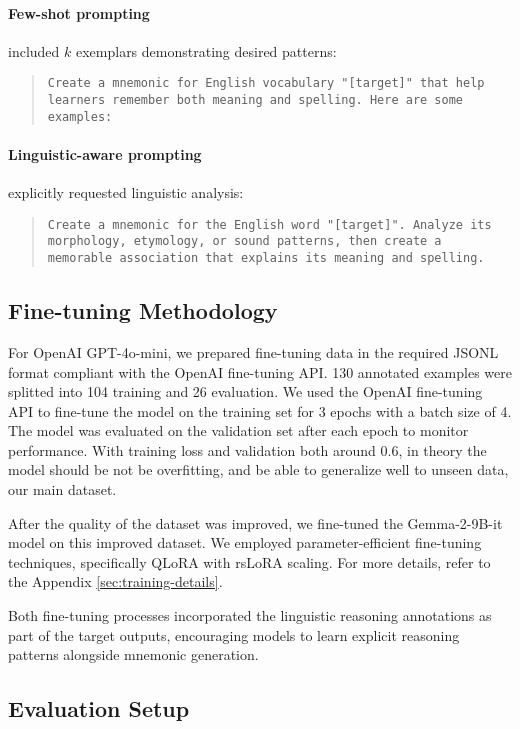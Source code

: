 \documentclass{article}
\newcounter{para}
\begin{document}
\paragraph{Few-shot prompting} included $k$ exemplars demonstrating desired patterns:

\begin{quote}
\texttt{Create a mnemonic for English vocabulary "[target]" that help learners remember both meaning and spelling. Here are some examples:}
\end{quote}

\paragraph{Linguistic-aware prompting} explicitly requested linguistic analysis:
\begin{quote}
\texttt{Create a mnemonic for the English word "[target]". Analyze its morphology, etymology, or sound patterns, then create a memorable association that explains its meaning and spelling.}

\end{quote}

\subsection{Fine-tuning Methodology} \label{sec:ft-methodology}
For OpenAI GPT-4o-mini, we prepared fine-tuning data in the required JSONL format compliant with the OpenAI fine-tuning API. 130 annotated examples were splitted into 104 training and 26 evaluation. We used the OpenAI fine-tuning API to fine-tune the model on the training set for 3 epochs with a batch size of 4. The model was evaluated on the validation set after each epoch to monitor performance. With training loss and validation both around 0.6, in theory the model should be not be overfitting, and be able to generalize well to unseen data, our main dataset.

After the quality of the dataset was improved, we fine-tuned the Gemma-2-9B-it model on this improved dataset. We employed parameter-efficient fine-tuning techniques, specifically QLoRA with rsLoRA scaling. For more details, refer to the Appendix \ref{sec:training-details}.

Both fine-tuning processes incorporated the linguistic reasoning annotations as part of the target outputs, encouraging models to learn explicit reasoning patterns alongside mnemonic generation.

\subsection{Evaluation Setup} \label{sec:evaluation-metrics}
\end{document}

